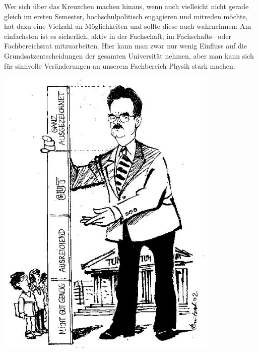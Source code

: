 Wer sich über das Kreuzchen machen hinaus, wenn auch vielleicht nicht gerade gleich im ersten Semester,
hochschulpolitisch engagieren und mitreden möchte, hat dazu eine Vielzahl an Möglichkeiten
und sollte diese auch wahrnehmen:
Am einfachsten ist es sicherlich, aktiv in der Fachschaft, im Fachschafts-- oder Fachbereichsrat mitzuarbeiten.
Hier kann man zwar nur wenig Einfluss auf die Grundsatzentscheidungen der gesamten Universität nehmen,
aber man kann sich für sinnvolle Veränderungen an unserem Fachbereich Physik stark machen.


\begin{center}
  \includegraphics[width=0.8\textwidth]{bilder/steinberg.jpg}
 \end{center}
